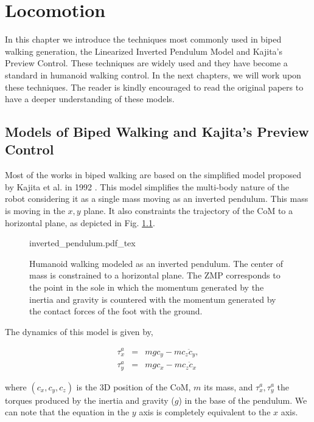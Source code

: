 
\chapter{Locomotion} 
\label{Chap:Locomotion-Control}

In this chapter we introduce the techniques most commonly used in biped walking generation, the Linearized Inverted Pendulum Model and Kajita's Preview Control. These techniques are widely used and they have become a standard in humanoid walking control. In the next chapters, we will work upon these techniques. The reader is kindly encouraged to read the original papers to have a deeper understanding of these models.


\section{Models of Biped Walking and Kajita's Preview Control}
Most of the works in biped walking are based on the simplified model proposed by Kajita et al. in 1992 \citep{Kajita1992}. This model simplifies the multi-body nature of the robot considering it as a single mass moving as an inverted pendulum. This mass is moving in the $x,y$ plane. It also constraints the trajectory of the CoM to a horizontal plane, as depicted in Fig. \ref{Fig:Inverted-Pendulum}.

\begin{figure}
  \centering
      {\def\svgwidth{1.0\columnwidth}
        
                   {inverted_pendulum.pdf_tex}}
      \caption[]{Humanoid walking modeled as an inverted pendulum. The center of mass is constrained to a horizontal plane. The ZMP corresponds to the point in the sole in which the momentum generated by the inertia and gravity is countered with the momentum generated by the contact forces of the foot with the ground.}
      \label{Fig:Inverted-Pendulum}
\end{figure}

The dynamics of this model is given by,

\begin{eqnarray}
\label{Eq:LIPM_dynamics}
\tau^a_x &=& mgc_y - mc_z \ddot{c}_y, \\
\tau^a_y &=& mgc_x - mc_z \ddot{c}_x
\end{eqnarray}

\noindent where $(c_x, c_y, c_z)$ is the 3D position of the CoM, $m$ its mass, and $\tau^a_x, \tau^a_y$ the torques produced by the inertia and gravity ($g$) in the base of the pendulum. We can note that the equation in the $y$ axis is completely equivalent to the $x$ axis.

